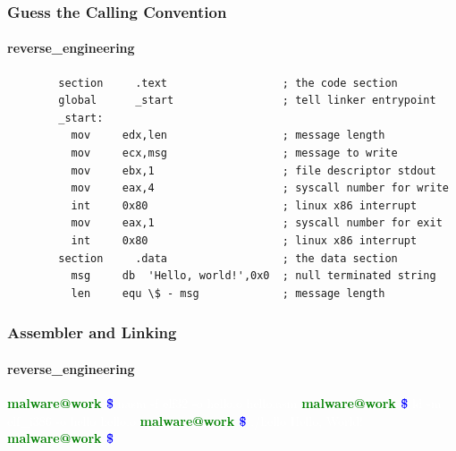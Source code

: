 \documentclass[aspectratio=169]{beamer}
\begin{document}
\begin{frame}[fragile]{}
  \frametitle{Guess the Calling Convention}
  \framesubtitle{reverse\_engineering}
  \begin{center}
    \begin{tcolorbox}[title=hello.asm,colback=black]
    \begin{minipage}{0.8\textwidth}
      \begin{verbatim}
        section     .text                  ; the code section
        global      _start                 ; tell linker entrypoint
        _start:
          mov     edx,len                  ; message length
          mov     ecx,msg                  ; message to write
          mov     ebx,1                    ; file descriptor stdout
          mov     eax,4                    ; syscall number for write
          int     0x80                     ; linux x86 interrupt
          mov     eax,1                    ; syscall number for exit
          int     0x80                     ; linux x86 interrupt
        section     .data                  ; the data section
          msg     db  'Hello, world!',0x0  ; null terminated string
          len     equ \$ - msg             ; message length
      \end{verbatim}
    \end{minipage}
    \end{tcolorbox}
  \end{center}
\end{frame}

\begin{frame}
  \frametitle{Assembler and Linking}
  \framesubtitle{reverse\_engineering}
  \begin{center}
    \begin{tcolorbox}[title=terminal,colback=black]
      \begin{minipage}{0.8\textwidth}
        \textbf{\textcolor{green}{malware@work \textcolor{blue}{\~ \$}}} \textcolor{white}{ nasm -f elf32 -o hello.o hello.asm}
        \newline
        \textbf{\textcolor{green}{malware@work \textcolor{blue}{\~ \$}}} \textcolor{white}{ ld -m elf\_i386 -o hello hello.o}
        \newline
        \textbf{\textcolor{green}{malware@work \textcolor{blue}{\~ \$}}} \textcolor{white}{ ./hello}
        \newline
        \textcolor{white}{ Hello, World!}
        \newline
        \textbf{\textcolor{green}{malware@work \textcolor{blue}{\~ \$}}}
      \end{minipage}
    \end{tcolorbox}
  \end{center}
\end{frame}
\end{document}
